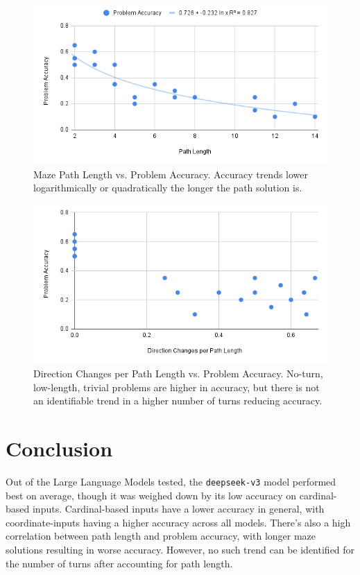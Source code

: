 \documentclass[conference]{IEEEtran}
\begin{document}
\begin{figure}[htbp]
  \centering
  \includegraphics[width=\columnwidth]{Maze Path Length vs. Problem Accuracy.png}
  \caption{Maze Path Length vs. Problem Accuracy. Accuracy trends lower logarithmically or quadratically the longer the path solution is.}
  \label{fig:maze_length_accuracy}
\end{figure}

\begin{figure}[htbp]
  \centering
  \includegraphics[width=\columnwidth]{Direction Changes per Path Length vs. Problem Accuracy.png}
  \caption{Direction Changes per Path Length vs. Problem Accuracy. No-turn, low-length, trivial problems are higher in accuracy, but there is not an identifiable trend in a higher number of turns reducing accuracy.}
  \label{fig:direction_change_accuracy}
\end{figure}

\section{Conclusion}

Out of the Large Language Models tested, the \texttt{deepseek-v3} model performed best on average, though it was weighed down by its low accuracy on cardinal-based inputs. Cardinal-based inputs have a lower accuracy in general, with coordinate-inputs having a higher accuracy across all models. There's also a high correlation between path length and problem accuracy, with longer maze solutions resulting in worse accuracy. However, no such trend can be identified for the number of turns after accounting for path length.
\end{document}
